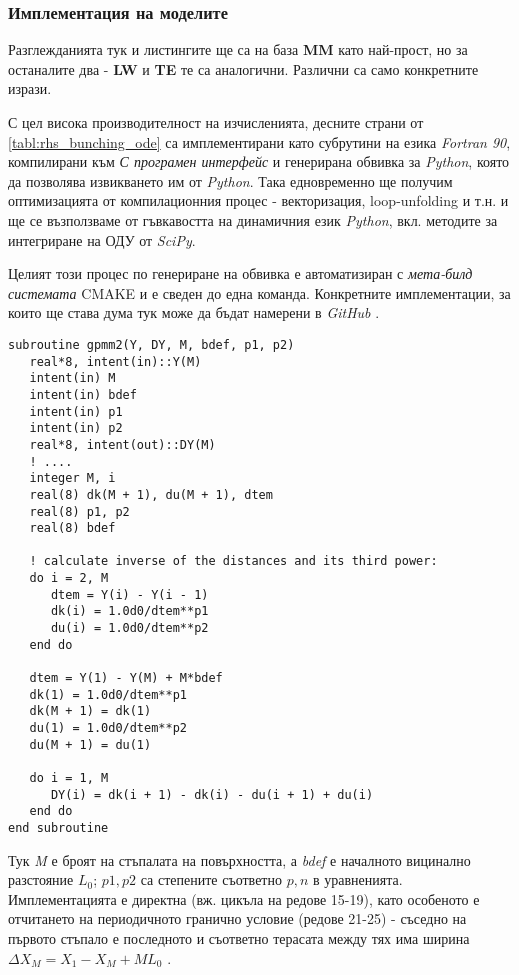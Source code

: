 \subsubsection{Имплементация на моделите}
Разглежданията тук и листингите ще са на база \textbf{MM} като най-прост, но за останалите два - \textbf{LW} и \textbf{TE} те са аналогични. Различни са само конкретните изрази.

С цел висока производителност на изчисленията, десните страни от \autoref{tabl:rhs_bunching_ode} са имплементирани като субрутини на езика \textit{Fortran 90}, компилирани към \textit{С програмен интерфейс} и генерирана обвивка за \textit{Python}, която да позволява извикването им от \textit{Python}. Така едновременно ще получим оптимизацията от компилационния процес - векторизация, loop-unfolding и т.н. и ще се възползваме от гъвкавостта на динамичния език \textit{Python}, вкл. методите за интегриране на ОДУ от \textit{SciPy}.

Целият този процес по генериране на обвивка е автоматизиран с \textit{мета-билд системата} CMAKE и е сведен до една команда. Конкретните имплементации, за които ще става дума тук може да бъдат намерени в \textit{GitHub} \cite{BunchingModelsGH}.

\begin{verbatim}
subroutine gpmm2(Y, DY, M, bdef, p1, p2)
   real*8, intent(in)::Y(M)
   intent(in) M
   intent(in) bdef
   intent(in) p1
   intent(in) p2
   real*8, intent(out)::DY(M)
   ! ....
   integer M, i
   real(8) dk(M + 1), du(M + 1), dtem
   real(8) p1, p2
   real(8) bdef
   
   ! calculate inverse of the distances and its third power:
   do i = 2, M
      dtem = Y(i) - Y(i - 1)
      dk(i) = 1.0d0/dtem**p1
      du(i) = 1.0d0/dtem**p2
   end do
   
   dtem = Y(1) - Y(M) + M*bdef
   dk(1) = 1.0d0/dtem**p1
   dk(M + 1) = dk(1)
   du(1) = 1.0d0/dtem**p2
   du(M + 1) = du(1)

   do i = 1, M
      DY(i) = dk(i + 1) - dk(i) - du(i + 1) + du(i)
   end do
end subroutine
\end{verbatim}

Тук \textit{M} е броят на стъпалата на повърхността, а \textit{bdef} е началното вицинално разстояние $L_0$; $p1, p2$ са степените съответно $p, n$ в уравненията. Имплементацията е директна (вж. цикъла на редове 15-19), като особеното е отчитането на периодичното гранично условие (редове 21-25) - съседно на първото стъпало е последното и съответно терасата между тях има ширина $\Delta X_{M} = X_1 - X_M + M L_0$ \cite{BunchingModelsGH}.  

